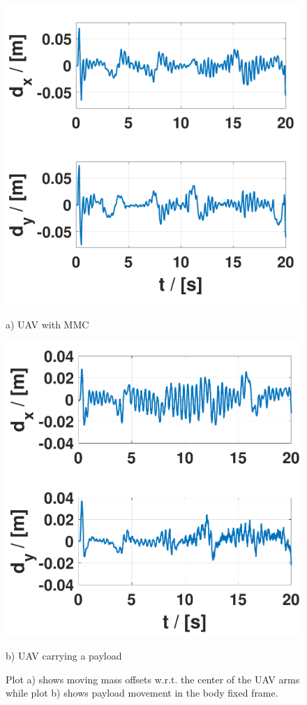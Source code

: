 \begin{figure}
	\centering
	\begin{minipage}{0.5\columnwidth}
		\centering
		\includegraphics[width=\columnwidth]{./pictures/mmcuav_control_inputs_crop.pdf}
		\caption*{a) UAV with MMC}
		\label{fig:mmcuav_control}
	\end{minipage}%
	\begin{minipage}{0.5\columnwidth}
		\centering
		\includegraphics[width=\columnwidth]{./pictures/mmuav_control_inputs_crop.pdf}
		\caption*{b) UAV carrying a payload}
		\label{fig:mmuav_control}
	\end{minipage}
	\caption{Plot a) shows moving mass offsets w.r.t. the center of the UAV arms while plot b) shows payload movement in the body fixed frame. }
\end{figure}


